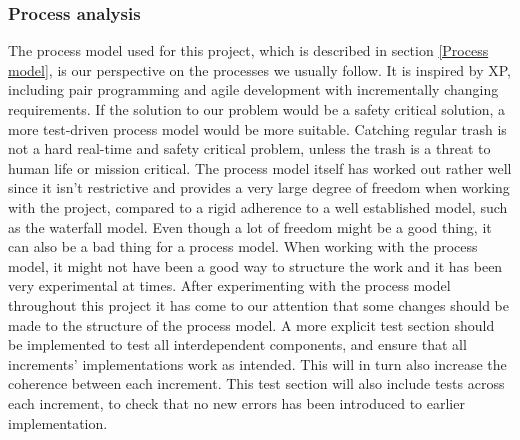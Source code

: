 \subsubsection{Process analysis}
The process model used for this project, which is described in section \ref{Process model}, is our perspective on the processes we usually follow. It is inspired by XP, including pair programming and agile development with incrementally changing requirements. If the solution to our problem would be a safety critical solution, a more test-driven process model would be more suitable. Catching regular trash is not a hard real-time and safety critical problem, unless the trash is a threat to human life or mission critical.\newline
The process model itself has worked out rather well since it isn’t restrictive and provides a very large degree of freedom when working with the project, compared to a rigid adherence to a well established model, such as the waterfall model. \newline
Even though a lot of freedom might be a good thing, it can also be a bad thing for a process model. When working with the process model, it might not have been a good way to structure the work and it has been very experimental at times. \newline
After experimenting with the process model throughout this project it has come to our attention that some changes should be made to the structure of the process model. A more explicit test section should be implemented to test all interdependent components, and ensure that all increments’ implementations work as intended. This will in turn also increase the coherence between each increment. This test section will also include tests across each increment, to check that no new errors has been introduced to earlier implementation.




